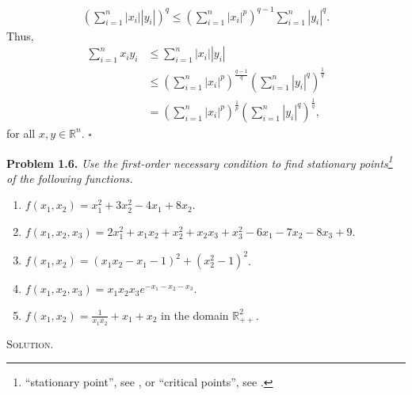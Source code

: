 \documentclass[a4paper]{article}
\numberwithin{equation}{section}
\begin{document}
\begin{enumerate}
\begin{align}
{\left( {\sum\limits_{i = 1}^n {\left| {{x_i}} \right|\left| {{y_i}} \right|} } \right)^q} \le {\left( {\sum\nolimits_{i = 1}^n {{{\left| {{x_i}} \right|}^p}} } \right)^{q - 1}}\sum\limits_{i = 1}^n {{{\left| {{y_i}} \right|}^q}} .
\end{align}
Thus,
\begin{align}
\sum\limits_{i = 1}^n {{x_i}{y_i}} &\le \sum\limits_{i = 1}^n {\left| {{x_i}} \right|\left| {{y_i}} \right|} \\
& \le {\left( {\sum\limits_{i = 1}^n {{{\left| {{x_i}} \right|}^p}} } \right)^{\frac{{q - 1}}{q}}}{\left( {\sum\limits_{i = 1}^n {{{\left| {{y_i}} \right|}^q}} } \right)^{\frac{1}{q}}}\\
& = {\left( {\sum\limits_{i = 1}^n {{{\left| {{x_i}} \right|}^p}} } \right)^{\frac{1}{p}}}{\left( {\sum\limits_{i = 1}^n {{{\left| {{y_i}} \right|}^q}} } \right)^{\frac{1}{q}}} ,
\end{align}
for all $x,y\in \mathbb{R}^n$. \hfill $\square$
\end{enumerate}
\textbf{Problem 1.6.} \textit{Use the first-order necessary condition to find stationary points\footnote{``stationary point'', see \cite{2}, or ``critical points'', see \cite{1}.} of the following functions.}
\begin{enumerate}
\item $f\left( {{x_1},{x_2}} \right) = x_1^2 + 3x_2^2 - 4{x_1} + 8{x_2}$.
\item $f\left( {{x_1},{x_2},{x_3}} \right) = 2x_1^2 + {x_1}{x_2} + x_2^2 + {x_2}{x_3} + x_3^2 - 6{x_1} - 7{x_2} - 8{x_3} + 9$.
\item $f\left( {{x_1},{x_2}} \right) = {\left( {{x_1}{x_2} - {x_1} - 1} \right)^2} + {\left( {x_2^2 - 1} \right)^2}$.
\item $f\left( {{x_1},{x_2},{x_3}} \right) = {x_1}{x_2}{x_3}{e^{ - {x_1} - {x_2} - {x_3}}}$.
\item $f\left( {{x_1},{x_2}} \right) = \frac{1}{{{x_1}{x_2}}} + {x_1} + {x_2}$ in the domain $\mathbb{R}_{++}^2$.
\end{enumerate}
\textsc{Solution.} 
\end{document}
